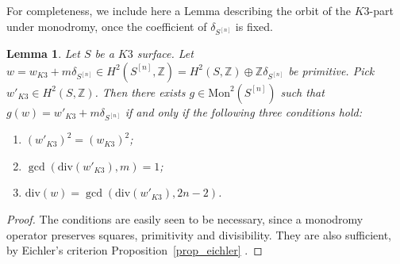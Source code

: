 \documentclass[12pt,a4paper]{amsart}
\theoremstyle{plain}
\newtheorem{lem}[thm]{Lemma}
\theoremstyle{definition}
\theoremstyle{remark}
\def\H{H}
\newcommand{\dv}{\mathrm{div}}
\begin{document}
For completeness, we include here a Lemma describing the orbit of the $K3$-part under monodromy, once the coefficient of $\delta_{S^{[n]}}$ is fixed.
\begin{lem}
    Let $S$ be a $K3$ surface. Let $w=w_{K3}+m\delta_{S^{[n]}}\in \H^2(S^{[n]},\mathbb{Z})=\H^2(S,\mathbb{Z})\oplus\mathbb{Z}\delta_{S^{[n]}}$ be primitive. Pick $w'_{K3}\in \H^2(S,\mathbb{Z})$. Then there exists $g\in \mathrm{Mon}^2(S^{[n]})$ such that $g(w)=w'_{K3}+m\delta_{S^{[n]}}$ if and only if the following three conditions hold:
    \begin{enumerate}
        \item [{\normalfont{(1)}}] $(w'_{K3})^2=(w_{K3})^2$;
        \item [{\normalfont{(2)}}] $\gcd(\dv(w'_{K3}),m)=1$;
        \item [{\normalfont{(3)}}] $\dv(w)=\gcd(\dv(w'_{K3}),2n-2)$.
    \end{enumerate}
\end{lem}
\begin{proof}
    The conditions are easily seen to be necessary, since a monodromy operator preserves squares, primitivity and divisibility. They are also sufficient, by Eichler's criterion Proposition~\ref{prop_eichler} .
\end{proof}
\end{document}
